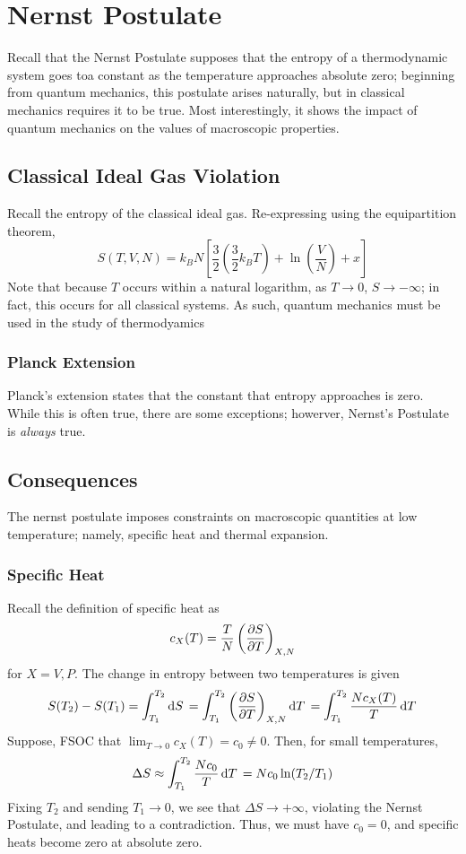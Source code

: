 \chapter{Nernst Postulate}
Recall that the Nernst Postulate supposes that the entropy of a thermodynamic system goes toa constant as the temperature approaches absolute zero; beginning from quantum mechanics, this postulate arises naturally, but in classical mechanics requires it to be true.
Most interestingly, it shows the impact of quantum mechanics on the values of macroscopic properties.

\section{Classical Ideal Gas Violation}
Recall the entropy of the classical ideal gas. Re-expressing using the equipartition theorem,
\begin{equation}
	S(T,V,N) = k_B N \left[\frac{3}{2}\left(\frac{3}{2}k_B T\right)+\ln\left(\frac{V}{N}\right)+x\right]
\end{equation}
Note that because \(T\) occurs within a natural logarithm, as \(T\to0\), \(S\to-\infty\); in fact, this occurs for all classical systems. As such, quantum mechanics must be used in the study of thermodyamics

\subsection{Planck Extension}
Planck's extension states that the constant that entropy approaches is zero. While this is often true, there are some exceptions; howerver, Nernst's Postulate is \emph{always} true.

\section{Consequences}
The nernst postulate imposes constraints on macroscopic quantities at low temperature; namely, specific heat and thermal expansion.

\subsection{Specific Heat}
Recall the definition of specific heat as
\[c_X(T)=\frac{T}{N}\left(\frac{\partial S}{\partial T}\right)_{X,N}\]
for \(X=V,P\). The change in entropy between two temperatures is given
\[S(T_2)-S(T_1)=\int_{T_1}^{T_2}\d{S} = \int_{T_1}^{T_2}\left(\pder{S}{T}\right)_{X,N}\d{T}=\int_{T_1}^{T_2}\frac{Nc_X(T)}{T}\d{T}\]
Suppose, FSOC that \(\displaystyle\lim_{T\to 0}c_X(T)=c_0\neq 0\). Then, for small temperatures,
\[\Delta S \approx \int_{T_1}^{T_2}\frac{Nc_0}{T}\d{T}=Nc_0\ln(T_2/T_1)\]
Fixing \(T_2\) and sending \(T_1\to 0\), we see that \(\Delta S\to+\infty\), violating the Nernst Postulate, and leading to a contradiction. Thus, we must have \(c_0=0\), and specific heats become zero at absolute zero.

